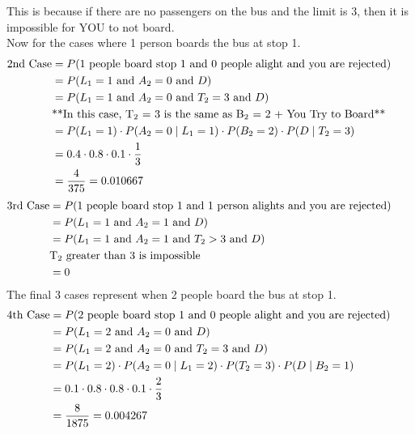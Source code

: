 \documentclass{article}
\numberwithin{equation}{section}
\newcommand{\eqname}[1]{\tag*{#1}}%
\begin{document}
This is because if there are no passengers on the bus and the limit is 3, then it is impossible for YOU to not board. \\
Now for the cases where 1 person boards the bus at stop 1.
\begin{align} 
	    \label{2nd Case}
		\text{2nd Case} &= P(\text{1 people board stop 1 and 0 people alight and you are rejected}) \eqname{} \\
		&= P(L\textsubscript{1} = 1 \text{ and } A\textsubscript{2} = 0 \text{ and } D) \eqname{} \\
		&= P(L_1 = 1 \text{ and } A_2 = 0 \text{ and } T_2 = 3 \text{ and } D)\eqname{} \\ 
		&\text{**In this case, T\textsubscript{2} = 3 is the same as B\textsubscript{2} = 2 + You Try to Board**}\eqname{} \\
		&= P(L_1 = 1) \cdot P(A_2 = 0 \mid L_1 = 1) \cdot P(B_2 = 2) \cdot P(D \mid T_2=3) \eqname{} \\
		&= 0.4 \cdot 0.8 \cdot 0.1 \cdot \frac{1}{3} \eqname{} \\
		&= \frac{4}{375} = 0.010667 \eqname{} \\
\end{align}
\begin{align} 
	    \label{3rd Case}
		\text{3rd Case} &= P(\text{1 people board stop 1 and 1 person alights and you are rejected}) \eqname{} \\
		&= P(L\textsubscript{1} = 1 \text{ and } A\textsubscript{2} = 1 \text{ and } D) \eqname{} \\
		&= P(L_1 = 1 \text{ and } A_2 = 1 \text{ and } T_2 > 3 \text{ and } D)\eqname{} \\ 
		& \text{T\textsubscript{2} greater than 3 is impossible} \eqname{} \\
		&= 0
\end{align}
The final 3 cases represent when 2 people board the bus at stop 1.
\begin{align} 
	    \label{4th Case}
		\text{4th Case} &= P(\text{2 people board stop 1 and 0 people alight and you are rejected}) \eqname{} \\
		&= P(L\textsubscript{1} = 2 \text{ and } A\textsubscript{2} = 0 \text{ and } D) \eqname{} \\
		&= P(L_1 = 2 \text{ and } A_2 = 0 \text{ and } T_2 = 3 \text{ and } D)\eqname{} \\ 
    	&= P(L_1 = 2) \cdot P(A_2 = 0 \mid L_1 = 2) \cdot P(T_2 = 3) \cdot P(D \mid B_2=1) \eqname{} \\
		&= 0.1 \cdot 0.8 \cdot 0.8 \cdot 0.1 \cdot \frac{2}{3} \eqname{} \\
		&= \frac{8}{1875} = 0.004267
\end{align}
\end{document}
